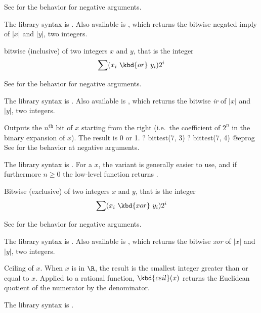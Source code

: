 See  for the behavior for negative arguments.

The library syntax is .
Also available is
, which returns the bitwise negated
imply of $|x|$ and $|y|$, two integers.

\label{se:bitor}
bitwise (inclusive)
 of two integers $x$ and $y$, that is the integer $$\sum
(x_i~\kbd{or}~y_i) 2^i$$

See  for the behavior for negative arguments.

The library syntax is .
Also available is
, which returns the bitwise \emph{ir}
of $|x|$ and $|y|$, two integers.

\label{se:bittest}
Outputs the $n^{\text{th}}$ bit of $x$ starting
from the right (i.e.~the coefficient of $2^n$ in the binary expansion of $x$).
The result is 0 or 1.
\bprog
? bittest(7, 3)
? bittest(7, 4)
@eprog\noindent
See  for the behavior at negative arguments.

The library syntax is .
For a  $x$, the variant  is
generally easier to use, and if furthermore $n\ge 0$ the low-level function
 returns .

\label{se:bitxor}
Bitwise (exclusive) 
of two integers $x$ and $y$, that is the integer
$$\sum (x_i~\kbd{xor}~y_i) 2^i$$

See  for the behavior for negative arguments.

The library syntax is .
Also available is
, which returns the bitwise \emph{xor}
of $|x|$ and $|y|$, two integers.

\label{se:ceil}
Ceiling of $x$. When $x$ is in $\R$, the result is the
smallest integer greater than or equal to $x$. Applied to a rational
function, $\kbd{ceil}(x)$ returns the Euclidean quotient of the numerator by
the denominator.

The library syntax is .

